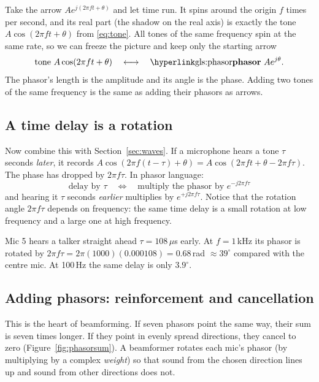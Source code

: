 \documentclass[11pt]{article}
\begin{document}
Take the arrow $Ae^{j(2\pi ft+\theta)}$ and let time run. It spins around the origin $f$ times per
second, and its real part (the shadow on the real axis) is exactly the tone
$A\cos(2\pi ft+\theta)$ from \eqref{eq:tone}. All tones of the same frequency spin at the same
rate, so we can freeze the picture and keep only the starting arrow
\[
  \text{tone }A\cos(2\pi ft+\theta)\quad\longleftrightarrow\quad\text{\term{phasor}{phasor} }Ae^{j\theta}.
\]
The phasor's length is the amplitude and its angle is the phase. Adding two tones of the same
frequency is the same as adding their phasors as arrows.

\subsection{A time delay is a rotation}

Now combine this with Section~\ref{sec:waves}. If a microphone hears a tone $\tau$ seconds
\emph{later}, it records $A\cos(2\pi f(t-\tau)+\theta)=A\cos(2\pi ft+\theta-2\pi f\tau)$. The
phase has dropped by $2\pi f\tau$. In phasor language:
\begin{equation}\label{eq:delayrot}
  \boxed{\ \text{delay by }\tau\quad\Longleftrightarrow\quad\text{multiply the phasor by }e^{-j2\pi f\tau}\ }
\end{equation}
and hearing it $\tau$ seconds \emph{earlier} multiplies by $e^{+j2\pi f\tau}$. Notice that the
rotation angle $2\pi f\tau$ depends on frequency: the same time delay is a small rotation at low
frequency and a large one at high frequency.

\begin{example}
Mic 5 hears a talker straight ahead $\tau=108\,\mu$s early. At $f=1$\,kHz its phasor is
rotated by $2\pi f\tau=2\pi(1000)(0.000108)=0.68$\,rad $\approx39^\circ$ compared with the
centre mic. At 100\,Hz the same delay is only $3.9^\circ$.
\end{example}

\subsection{Adding phasors: reinforcement and cancellation}

This is the heart of beamforming. If seven phasors point the same way, their sum is seven times
longer. If they point in evenly spread directions, they cancel to zero
(Figure~\ref{fig:phasorsum}). A beamformer rotates each mic's phasor (by multiplying by a complex
\emph{weight}) so that sound from the chosen direction lines up and sound from other directions
does not.
\end{document}
